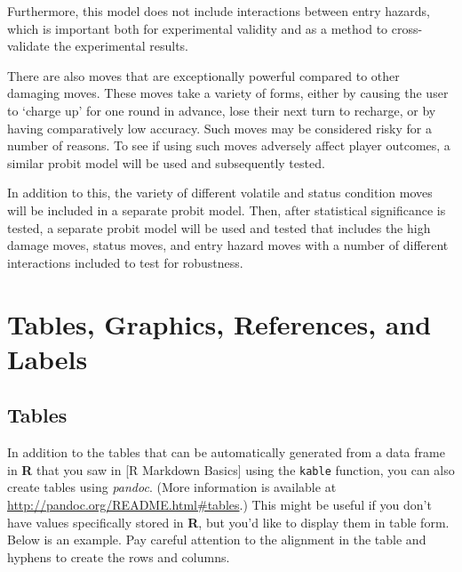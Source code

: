 \documentclass[12pt,twoside]{reedthesis}
\begin{document}
  Furthermore, this model does not include interactions between entry
  hazards, which is important both for experimental validity and as a
  method to cross-validate the experimental results.
  
  There are also moves that are exceptionally powerful compared to other
  damaging moves. These moves take a variety of forms, either by causing
  the user to `charge up' for one round in advance, lose their next turn
  to recharge, or by having comparatively low accuracy. Such moves may be
  considered risky for a number of reasons. To see if using such moves
  adversely affect player outcomes, a similar probit model will be used
  and subsequently tested.
  
  In addition to this, the variety of different volatile and status
  condition moves will be included in a separate probit model. Then, after
  statistical significance is tested, a separate probit model will be used
  and tested that includes the high damage moves, status moves, and entry
  hazard moves with a number of different interactions included to test
  for robustness.
  
  \chapter{Tables, Graphics, References, and Labels}\label{ref-labels}
  
  \section{Tables}\label{tables}
  
  In addition to the tables that can be automatically generated from a
  data frame in \textbf{R} that you saw in {[}R Markdown Basics{]} using
  the \texttt{kable} function, you can also create tables using
  \emph{pandoc}. (More information is available at
  \url{http://pandoc.org/README.html\#tables}.) This might be useful if
  you don't have values specifically stored in \textbf{R}, but you'd like
  to display them in table form. Below is an example. Pay careful
  attention to the alignment in the table and hyphens to create the rows
  and columns.
  
\end{document}
